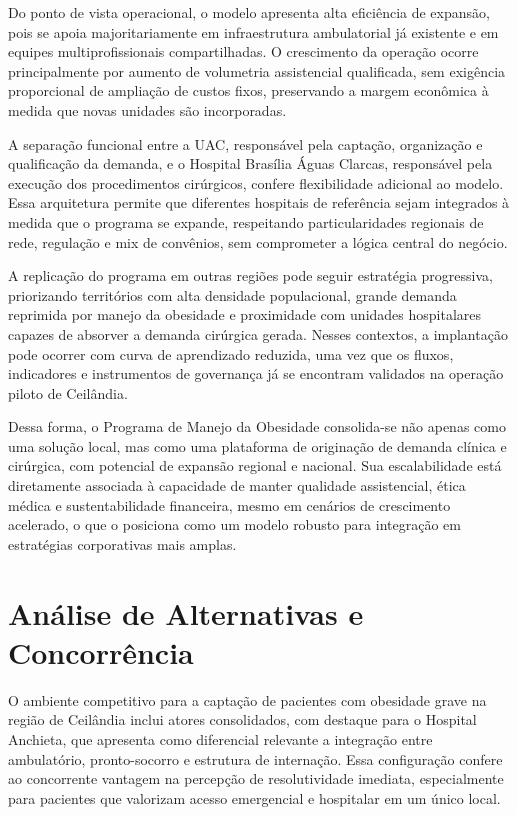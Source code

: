 \documentclass[12pt]{article}
\begin{document}
Do ponto de vista operacional, o modelo apresenta alta eficiência de expansão, pois se apoia majoritariamente em infraestrutura ambulatorial já existente e em equipes multiprofissionais compartilhadas. O crescimento da operação ocorre principalmente por aumento de volumetria assistencial qualificada, sem exigência proporcional de ampliação de custos fixos, preservando a margem econômica à medida que novas unidades são incorporadas.

A separação funcional entre a UAC, responsável pela captação, organização e qualificação da demanda, e o Hospital Brasília Águas Clarcas, responsável pela execução dos procedimentos cirúrgicos, confere flexibilidade adicional ao modelo. Essa arquitetura permite que diferentes hospitais de referência sejam integrados à medida que o programa se expande, respeitando particularidades regionais de rede, regulação e mix de convênios, sem comprometer a lógica central do negócio.

A replicação do programa em outras regiões pode seguir estratégia progressiva, priorizando territórios com alta densidade populacional, grande demanda reprimida por manejo da obesidade e proximidade com unidades hospitalares capazes de absorver a demanda cirúrgica gerada. Nesses contextos, a implantação pode ocorrer com curva de aprendizado reduzida, uma vez que os fluxos, indicadores e instrumentos de governança já se encontram validados na operação piloto de Ceilândia.

Dessa forma, o Programa de Manejo da Obesidade consolida-se não apenas como uma solução local, mas como uma plataforma de originação de demanda clínica e cirúrgica, com potencial de expansão regional e nacional. Sua escalabilidade está diretamente associada à capacidade de manter qualidade assistencial, ética médica e sustentabilidade financeira, mesmo em cenários de crescimento acelerado, o que o posiciona como um modelo robusto para integração em estratégias corporativas mais amplas.

\FGVNewPage

\section{Análise de Alternativas e Concorrência}
\label{sec:org608b7d1}
O ambiente competitivo para a captação de pacientes com obesidade grave na região de Ceilândia inclui atores consolidados, com destaque para o Hospital Anchieta, que apresenta como diferencial relevante a integração entre ambulatório, pronto-socorro e estrutura de internação. Essa configuração confere ao concorrente vantagem na percepção de resolutividade imediata, especialmente para pacientes que valorizam acesso emergencial e hospitalar em um único local.
\end{document}
